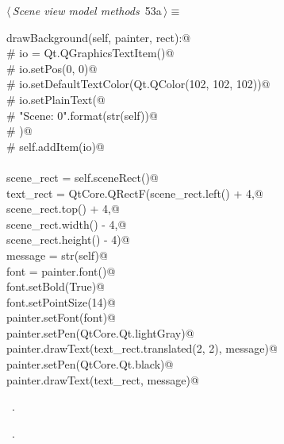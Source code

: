 \documentclass[
    a4paper,      %
    10pt,         %
    openright,    %
    notitlepage,  %
    parskip=half, %
]{scrreprt}       %
\theoremstyle{definition}                    %
\begin{document}
\begin{flushleft} \small
\begin{minipage}{\linewidth}\label{scrap82}\raggedright\small
{} $\langle\,${\itshape Scene view model methods}\nobreak\ {\footnotesize {53a}}$\,\rangle\equiv$
\vspace{-1exm}
\begin{list}{}{} \item
\mbox{}\lstinline@def drawBackground(self, painter, rect):@\\
\mbox{}\lstinline@    # io = Qt.QGraphicsTextItem()@\\
\mbox{}\lstinline@    # io.setPos(0, 0)@\\
\mbox{}\lstinline@    # io.setDefaultTextColor(Qt.QColor(102, 102, 102))@\\
\mbox{}\lstinline@    # io.setPlainText(@\\
\mbox{}\lstinline@    #     "Scene: {0}".format(str(self))@\\
\mbox{}\lstinline@    # )@\\
\mbox{}\lstinline@    # self.addItem(io)@\\
\mbox{}\lstinline@@\\
\mbox{}\lstinline@    scene_rect = self.sceneRect()@\\
\mbox{}\lstinline@    text_rect = QtCore.QRectF(scene_rect.left()   + 4,@\\
\mbox{}\lstinline@                              scene_rect.top()    + 4,@\\
\mbox{}\lstinline@                              scene_rect.width()  - 4,@\\
\mbox{}\lstinline@                              scene_rect.height() - 4)@\\
\mbox{}\lstinline@    message = str(self)@\\
\mbox{}\lstinline@    font = painter.font()@\\
\mbox{}\lstinline@    font.setBold(True)@\\
\mbox{}\lstinline@    font.setPointSize(14)@\\
\mbox{}\lstinline@    painter.setFont(font)@\\
\mbox{}\lstinline@    painter.setPen(QtCore.Qt.lightGray)@\\
\mbox{}\lstinline@    painter.drawText(text_rect.translated(2, 2), message)@\\
\mbox{}\lstinline@    painter.setPen(QtCore.Qt.black)@\\
\mbox{}\lstinline@    painter.drawText(text_rect, message)@{\NWsep}
\end{list}
\vspace{-1.5ex}
\footnotesize
\begin{list}{}{\setlength{\itemsep}{-\parsep}\setlength{\itemindent}{-\leftmargin}}
\item \NWtxtMacroDefBy\ .
\item \NWtxtMacroRefIn\ .

\item{}
\end{list}
\end{minipage}\vspace{4ex}
\end{flushleft}
\end{document}

